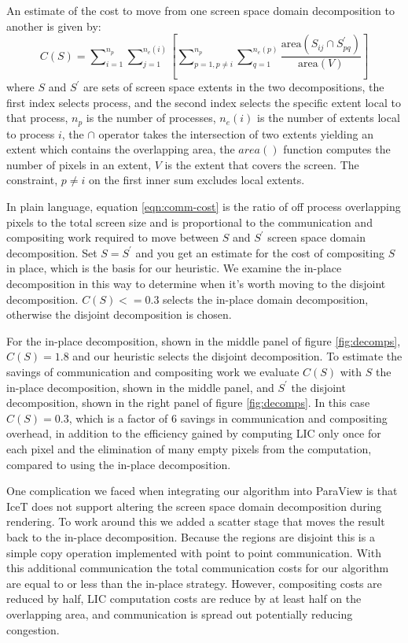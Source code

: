 \documentclass[a4paper,10pt]{article}
\begin{document}
An estimate of the cost to move from one screen space domain decomposition to another is given by:
\begin{equation}
C(S) = \sum\nolimits_{i=1}^{n_p} \sum\nolimits_{j=1}^{n_e(i)} \left[ \sum\nolimits_{p=1,p \neq i}^{n_p} \sum\nolimits_{q=1}^{n_e(p)} \frac{ \textrm{area}(S_{ij} \cap S^{'}_{pq}) }{ \textrm{area}(V) } \right]
\label{eqn:comm-cost}
\end{equation}
where $S$ and $S^{'}$ are sets of screen space extents in the two decompositions, the first index selects process, and the second index selects the specific extent local to that process, $n_p$ is the number of processes, $n_e(i)$ is the number of extents local to process $i$, the $\cap$ operator takes the intersection of two extents yielding an extent which contains the overlapping area, the $area()$ function computes the number of pixels in an extent, $V$ is the extent that covers the screen. The constraint, $p \neq i$ on the first inner sum excludes local extents.

In plain language, equation \ref{eqn:comm-cost} is the ratio of off process overlapping pixels to the total screen size and is proportional to the communication and compositing work required to move between $S$ and $S^{'}$ screen space domain decomposition. Set $S=S^{'}$ and you get an estimate for the cost of compositing $S$ in place, which is the basis for our heuristic. We examine the in-place decomposition in this way to determine when it's worth moving to the disjoint decomposition. $C(S)<=0.3$ selects the in-place domain decomposition, otherwise the disjoint decomposition is chosen.

For the in-place decomposition, shown in the middle panel of figure \ref{fig:decomps}, $C(S)=1.8$ and our heuristic selects the disjoint decomposition. To estimate the savings of communication and compositing work we evaluate $C(S)$ with $S$ the in-place decomposition, shown in the middle panel, and $S^{'}$ the disjoint decomposition, shown in the right panel of figure \ref{fig:decomps}. In this case $C(S)=0.3$, which is a factor of $6$ savings in communication and compositing overhead, in addition to the efficiency gained by computing LIC only once for each pixel and the elimination of many empty pixels from the computation, compared to using the in-place decomposition.

One complication we faced when integrating our algorithm into ParaView is that IceT does not support altering the screen space domain decomposition during rendering. To work around this we added a scatter stage that moves the result back to the in-place decomposition. Because the regions are disjoint this is a simple copy operation implemented with point to point communication. With this additional communication the total communication costs for our algorithm are equal to or less than the in-place strategy. However, compositing costs are reduced by half, LIC computation costs are reduce by at least half on the overlapping area, and communication is spread out potentially reducing congestion.
\end{document}
